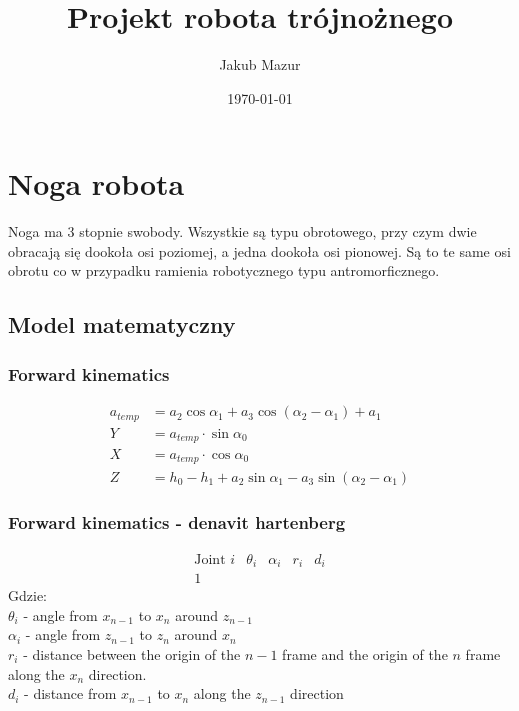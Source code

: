 \documentclass[a4paper,13pt]{article}
\title{Projekt robota trójnożnego}
\author{Jakub Mazur }
\date{\today}
\begin{document}


\maketitle

\hypersetup{
	linktocpage=true,
    colorlinks=true,
    urlcolor=red,
    linktoc=all,
    linkcolor=blue,
}
\tableofcontents

\section{Noga robota}
Noga ma 3 stopnie swobody. Wszystkie są typu obrotowego, przy czym dwie obracają się dookoła osi poziomej, a jedna dookoła osi pionowej. Są to te same osi obrotu co w przypadku ramienia robotycznego typu antromorficznego.
\subsection{Model matematyczny}
\subsubsection{Forward kinematics}

\begin{equation} \label{eq1}
\begin{split}
a_{temp} &= a_2 \cos{\alpha_1} + a_3 \cos{\left(\alpha_2 - \alpha_1\right)} + a_1\\
Y &= a_{temp} \cdot \sin{\alpha_0}\\
X &= a_{temp} \cdot \cos{\alpha_0}\\
Z &= h_0 - h_1 + a_2 \sin{\alpha_1} - a_3 \sin{\left(\alpha_2 - \alpha_1\right)}
\end{split}
\end{equation}

\subsubsection{Forward kinematics - denavit hartenberg \cite{DH_AA_article}}

\[
\begin{array}{c|cccc}
\textrm{Joint } i & \theta_i & \alpha_i & r_i & d_i \\
1 
\end{array}
\]
Gdzie: \\
$\theta_i$ - angle from $x_{n-1}$ to $x_n$ around $z_{n-1}$\\
$\alpha_i$ - angle from $z_{n-1}$ to $z_n$ around $x_n$\\
$r_i$ - distance between the origin of the $n-1$ frame and the origin of the $n$ frame along the $x_n$ direction.\\ 
$d_i$ - distance from $x_{n-1}$ to $x_n$ along the $z_{n-1}$ direction\\
\end{document}
